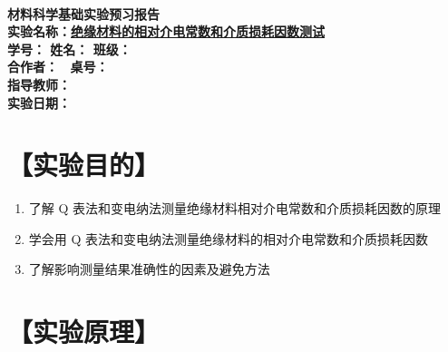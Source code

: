 \documentclass[a4paper,utf8]{article}
\begin{document}
\begin{center}
    {\mbox{}\\[7em]\bfseries\songti%
    材料科学基础实验预习报告}\\[34mm]
    {\bfseries\songti
    实验名称：\uline{\hfill\mbox{绝缘材料的相对介电常数和介质损耗因数测试}\hfill} \\[2.9mm]
    学\quad 号：\uline{}\hfill
    姓\quad 名：\uline{}\hfill
    班\quad 级：\uline{} \\[2.9mm]
    合作者：\uline{\makebox[25mm]{}}\enspace~
    桌\quad 号：\uline{\makebox[25mm]{}}\hfill\mbox{}\\[2.9mm]
    指导教师：\uline{}\hfill\mbox{} \\[2.9mm]
    实验日期：\uline{\makebox[30mm]{}}\hfill\mbox{} \\[58.7mm]
    }
\end{center}
\newpage
\section*{【实验目的】}
    \begin{enumerate}
        \item 了解 Q 表法和变电纳法测量绝缘材料相对介电常数和介质损耗因数的原理
        \item 学会用 Q 表法和变电纳法测量绝缘材料的相对介电常数和介质损耗因数
        \item 了解影响测量结果准确性的因素及避免方法
    \end{enumerate}
\section*{【实验原理】}%
\end{document}

